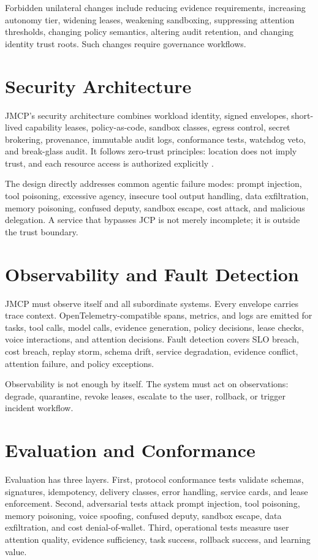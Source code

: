 \documentclass[12pt,journal,onecolumn,draftclsnofoot]{IEEEtran}
\begin{document}
Forbidden unilateral changes include reducing evidence requirements, increasing autonomy tier, widening leases, weakening sandboxing, suppressing attention thresholds, changing policy semantics, altering audit retention, and changing identity trust roots. Such changes require governance workflows.

\section{Security Architecture}
JMCP's security architecture combines workload identity, signed envelopes, short-lived capability leases, policy-as-code, sandbox classes, egress control, secret brokering, provenance, immutable audit logs, conformance tests, watchdog veto, and break-glass audit. It follows zero-trust principles: location does not imply trust, and each resource access is authorized explicitly \cite{nistzt}.

The design directly addresses common agentic failure modes: prompt injection, tool poisoning, excessive agency, insecure tool output handling, data exfiltration, memory poisoning, confused deputy, sandbox escape, cost attack, and malicious delegation. A service that bypasses JCP is not merely incomplete; it is outside the trust boundary.

\section{Observability and Fault Detection}
JMCP must observe itself and all subordinate systems. Every envelope carries trace context. OpenTelemetry-compatible spans, metrics, and logs are emitted for tasks, tool calls, model calls, evidence generation, policy decisions, lease checks, voice interactions, and attention decisions. Fault detection covers SLO breach, cost breach, replay storm, schema drift, service degradation, evidence conflict, attention failure, and policy exceptions.

Observability is not enough by itself. The system must act on observations: degrade, quarantine, revoke leases, escalate to the user, rollback, or trigger incident workflow.

\section{Evaluation and Conformance}
Evaluation has three layers. First, protocol conformance tests validate schemas, signatures, idempotency, delivery classes, error handling, service cards, and lease enforcement. Second, adversarial tests attack prompt injection, tool poisoning, memory poisoning, voice spoofing, confused deputy, sandbox escape, data exfiltration, and cost denial-of-wallet. Third, operational tests measure user attention quality, evidence sufficiency, task success, rollback success, and learning value.
\end{document}
